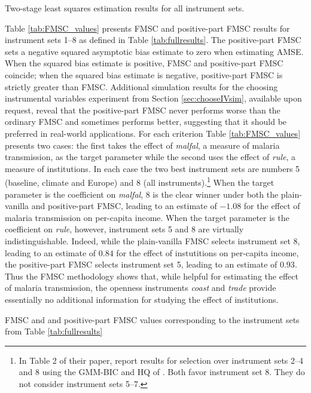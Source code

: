 \begin{table}[h]
\centering

\caption{Two-stage least squares estimation results for all instrument sets.}
\label{tab:fullresults}

\end{table}

Table \ref{tab:FMSC_values} presents FMSC and positive-part FMSC results for instrument sets 1--8  as defined in Table \ref{tab:fullresults}.
The positive-part FMSC sets a negative squared asymptotic bias estimate to zero when estimating AMSE.
When the squared bias estimate is positive, FMSC and positive-part FMSC coincide; when the squared bias estimate is negative, positive-part FMSC is strictly greater than FMSC. 
Additional simulation results for the choosing instrumental variables experiment from Section \ref{sec:chooseIVsim}, available upon request, reveal that the positive-part FMSC never performs worse than the ordinary FMSC and sometimes performs better, suggesting that it should be preferred in real-world applications. 
For each criterion Table \ref{tab:FMSC_values} presents two cases: the first takes the effect of \emph{malfal}, a measure of malaria transmission, as the target parameter while the second uses the effect of \emph{rule}, a measure of institutions. 
In each case the two best instrument sets are numbers 5 (baseline, climate and Europe) and 8 (all instruments).\footnote{In Table 2 of their paper, \cite{Carstensen2006} report results for selection over instrument sets 2--4 and 8 using the GMM-BIC and HQ of \cite{Andrews1999}. Both favor instrument set 8. They do not consider instrument sets 5--7.}
When the target parameter is the coefficient on \emph{malfal}, 8 is the clear winner under both the plain-vanilla and positive-part FMSC, leading to an estimate of $-1.08$ for the effect of malaria transmission on per-capita income.
When the target parameter is the coefficient on \emph{rule}, however, instrument sets 5 and 8 are virtually indistinguishable.
Indeed, while the plain-vanilla FMSC selects instrument set 8, leading to an estimate of $0.84$ for the effect of instutitions on per-capita income, the positive-part FMSC selects instrument set 5, leading to an estimate of $0.93$. 
Thus the FMSC methodology shows that, while helpful for estimating the effect of malaria transmission, the openness instruments \emph{coast} and \emph{trade} provide essentially no additional information for studying the effect of institutions.

\begin{table}[htbp]
	\centering
	
		\caption{FMSC and and positive-part FMSC values corresponding to the instrument sets from Table \ref{tab:fullresults}}
		\label{tab:FMSC_values}
\end{table}

